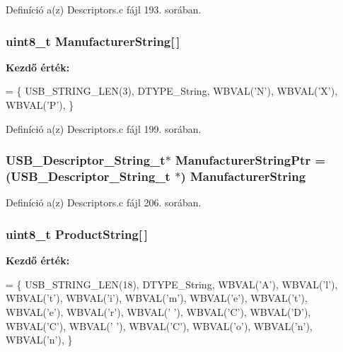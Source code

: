 Definíció a(z) Descriptors.\-c fájl 193. sorában.

\subsubsection[{Manufacturer\-String}]{\setlength{\rightskip}{0pt plus 5cm}uint8\-\_\-t Manufacturer\-String[$\,$]}\label{_descriptors_8c_af43938f971837cb37b3191312503a7a3}
{\bfseries Kezdő érték\-:}
\begin{DoxyCode}
= \{
    USB\_STRING\_LEN(3),
    DTYPE\_String,
    WBVAL(\textcolor{charliteral}{'N'}),
    WBVAL(\textcolor{charliteral}{'X'}),
    WBVAL(\textcolor{charliteral}{'P'}),
\}
\end{DoxyCode}


Definíció a(z) Descriptors.\-c fájl 199. sorában.

\subsubsection[{Manufacturer\-String\-Ptr}]{\setlength{\rightskip}{0pt plus 5cm}U\-S\-B\-\_\-\-Descriptor\-\_\-\-String\-\_\-t$\ast$ Manufacturer\-String\-Ptr = (U\-S\-B\-\_\-\-Descriptor\-\_\-\-String\-\_\-t $\ast$) {\bf Manufacturer\-String}}\label{_descriptors_8c_a48338794dea700974f8b0b043d0a4d60}


Definíció a(z) Descriptors.\-c fájl 206. sorában.

\subsubsection[{Product\-String}]{\setlength{\rightskip}{0pt plus 5cm}uint8\-\_\-t Product\-String[$\,$]}\label{_descriptors_8c_afb016d49474419471ed53243c36007f6}
{\bfseries Kezdő érték\-:}
\begin{DoxyCode}
= \{
    USB\_STRING\_LEN(18),
    DTYPE\_String,
    WBVAL(\textcolor{charliteral}{'A'}),
    WBVAL(\textcolor{charliteral}{'l'}),
    WBVAL(\textcolor{charliteral}{'t'}),
    WBVAL(\textcolor{charliteral}{'i'}),
    WBVAL(\textcolor{charliteral}{'m'}),
    WBVAL(\textcolor{charliteral}{'e'}),
    WBVAL(\textcolor{charliteral}{'t'}),
    WBVAL(\textcolor{charliteral}{'e'}),
    WBVAL(\textcolor{charliteral}{'r'}),
    WBVAL(\textcolor{charliteral}{' '}),
    WBVAL(\textcolor{charliteral}{'C'}),
    WBVAL(\textcolor{charliteral}{'D'}),
    WBVAL(\textcolor{charliteral}{'C'}),
    WBVAL(\textcolor{charliteral}{' '}),
    WBVAL(\textcolor{charliteral}{'C'}),
    WBVAL(\textcolor{charliteral}{'o'}),
    WBVAL(\textcolor{charliteral}{'n'}),
    WBVAL(\textcolor{charliteral}{'n'}),
\}
\end{DoxyCode}



